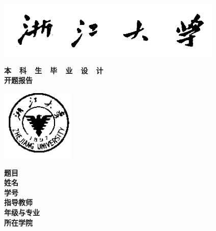 \thispagestyle{empty}

{
\setlength{\parindent}{0em}
\renewcommand{\baselinestretch}{2}

\vspace*{-7mm}

\begin{center}
  \includegraphics[width=108mm]{data/cover/xiaoming}
\end{center}

\vspace{-1mm}

{
\renewcommand{\baselinestretch}{1.8}
\heiti\erhao\bfseries
\centering
本~~科~~生~~毕~~业~~设~~计 \\
开题报告 \par
}

\vspace{4em}

\begin{center}
  \includegraphics[width=35mm]{data/cover/xiaobiao}
\end{center}

\vspace{3em}

{
\renewcommand{\baselinestretch}{1.65}
\songti\sanhao\bfseries
\centering
题目 \; \underline{\makebox[16em]{\zjutitlec}} \\
姓名 \; \underline{\makebox[16em]{\zjuauthornamec}} \\
学号 \; \underline{\makebox[16em]{\zjuauthorid}} \\
指导教师 \; \underline{\makebox[14em]{\zjumentorc}} \\
年级与专业 \; \underline{\makebox[13em]{\zjugrade~~\zjumajor}} \\
所在学院 \; \underline{\makebox[14em]{\zjucollegec}} \par
}
}

